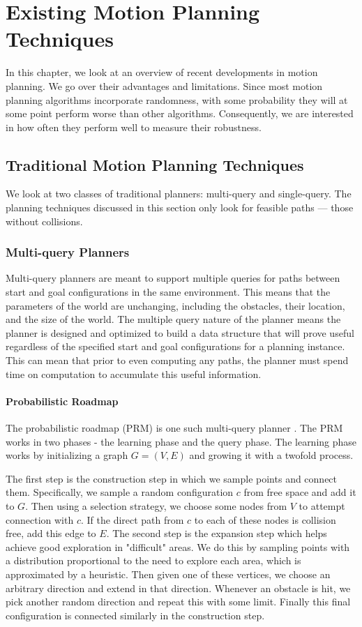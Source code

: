 \chapter{Existing Motion Planning Techniques}
In this chapter, we look at an overview of recent developments in motion planning. We go over their advantages and limitations. Since most motion planning algorithms incorporate randomness, with some probability they will at some point perform worse than other algorithms. Consequently, we are interested in how often they perform well to measure their robustness.

\section{Traditional Motion Planning Techniques} \label{planning:techniques}
We look at two classes of traditional planners: multi-query and single-query. The planning techniques discussed in this section only look for feasible paths --- those without collisions.

\subsection{Multi-query Planners}
Multi-query planners are meant to support multiple queries for paths between start and goal configurations in the same environment. This means that the parameters of the world are unchanging, including the obstacles, their location, and the size of the world. The multiple query nature of the planner means the planner is designed and optimized to build a data structure that will prove useful regardless of the specified start and goal configurations for a planning instance. This can mean that prior to even computing any paths, the planner must spend time on computation to accumulate this useful information.

\subsubsection{Probabilistic Roadmap}
The probabilistic roadmap (PRM) is one such multi-query planner \cite{kavraki:prm}. The PRM works in two phases - the learning phase and the query phase. The learning phase works by initializing a graph $G=(V,E)$ and growing it with a twofold process. 

The first step is the construction step in which we sample points and connect them. Specifically, we sample a random configuration $c$ from free space and add it to $G$. Then using a selection strategy, we choose some nodes from $V$ to attempt connection with $c$. If the direct path from $c$ to each of these nodes is collision free, add this edge to $E$. The second step is the expansion step which helps achieve good exploration in "difficult" areas. We do this by sampling points with a distribution proportional to the need to explore each area, which is approximated by a heuristic. Then given one of these vertices, we choose an arbitrary direction and extend in that direction. Whenever an obstacle is hit, we pick another random direction and repeat this with some limit. Finally this final configuration is connected similarly in the construction step. 

